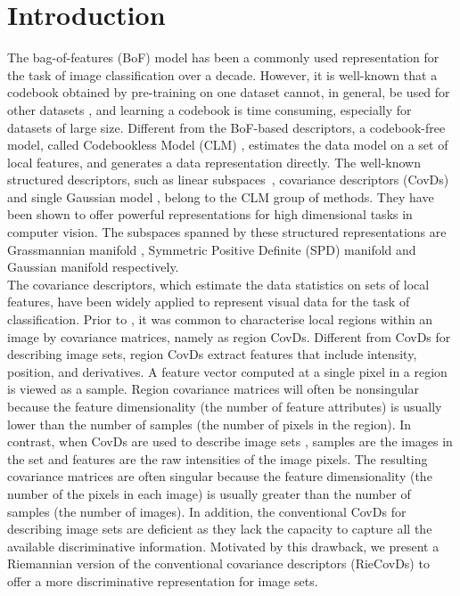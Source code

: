 \documentclass[review]{elsarticle}
\begin{document}
\linenumbers
\section{Introduction}
	\indent The bag-of-features (BoF) model \cite{sivic2003video} has been a commonly used representation for the task of image classification over a decade. However, it is well-known that a codebook obtained by pre-training on one dataset cannot, in general,  be used for other datasets  \cite{zhou2014towards}, and learning a codebook is time consuming, especially for datasets of large size. Different from the BoF-based descriptors, a codebook-free model, called Codebookless Model (CLM) \cite{wang2016towards}, estimates the data model on a set of local features, and generates a  data representation directly. The well-known structured descriptors, such as linear subspaces~\cite{hamm2008grassmann,hamm2009extended}, covariance descriptors (CovDs)\cite{wang2012covariance,tuzel2006region,tuzel2008pedestrian} and single Gaussian model \cite{li2017local,wang2016towards}, belong to the CLM group of methods. They have been shown to offer powerful representations for high dimensional tasks in computer vision. The subspaces spanned by these structured representations are  Grassmannian manifold \cite{hamm2008grassmann}, Symmetric Positive Definite (SPD) manifold \cite{wang2012covariance} and Gaussian manifold \cite{wang2016towards} respectively.\\
	
	\indent The covariance descriptors, which  estimate the data statistics on  sets of local features, have been widely applied to represent visual data for the task of classification. Prior to \cite{wang2012covariance}, it was common to characterise local regions within an image by covariance matrices, namely as region CovDs. Different from CovDs for describing image sets, region CovDs extract features that include intensity, position, and derivatives. A feature vector computed at a single pixel in a region is viewed as a sample. Region covariance matrices will often be nonsingular because the feature dimensionality (the number of feature attributes) is usually lower than the number of samples (the number of pixels in the region). In contrast, when CovDs are used to describe image sets \cite{wang2012covariance}, samples are the images in the set and features are the raw intensities of the image pixels. The resulting covariance matrices are often singular because the feature dimensionality (the number of the pixels in each image) is usually greater than the number of samples (the number of images). In addition, the conventional CovDs for describing image sets are deficient as  they lack the capacity to capture all the available discriminative information. Motivated by this drawback, we present a Riemannian version of the conventional covariance descriptors (RieCovDs) to offer a more discriminative representation for image sets. 
	
\end{document}

